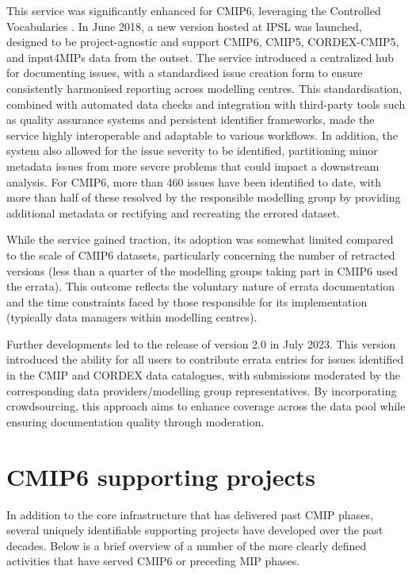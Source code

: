 \documentclass[manuscript]{copernicus}
\begin{document}
This service was significantly enhanced for CMIP6, leveraging the Controlled Vocabularies \citep[see \autoref{sec:CMIPCVs};][]{durack_cmip6_2024}. In June 2018, a new version hosted at IPSL was launched, designed to be project-agnostic and support CMIP6, CMIP5, CORDEX-CMIP5, and input4MIPs data from the outset. The service introduced a centralized hub for documenting issues, with a standardised issue creation form to ensure consistently harmonised reporting across modelling centres. This standardisation, combined with automated data checks and integration with third-party tools such as quality assurance systems and persistent identifier frameworks, made the service highly interoperable and adaptable to various workflows. In addition, the system also allowed for the issue severity to be identified, partitioning minor metadata issues from more severe problems that could impact a downstream analysis. For CMIP6, more than 460 issues have been identified to date, with more than half of these resolved by the responsible modelling group by providing additional metadata or rectifying and recreating the errored dataset.

While the service gained traction, its adoption was somewhat limited compared to the scale of CMIP6 datasets, particularly concerning the number of retracted versions (less than a quarter of the modelling groups taking part in CMIP6 used the errata). This outcome reflects the voluntary nature of errata documentation and the time constraints faced by those responsible for its implementation (typically data managers within modelling centres).

Further developments led to the release of version 2.0 in July 2023. This version introduced the ability for all users to contribute errata entries for issues identified in the CMIP and CORDEX data catalogues, with submissions moderated by the corresponding data providers/modelling group representatives. By incorporating crowdsourcing, this approach aims to enhance coverage across the data pool while ensuring documentation quality through moderation.


\section{CMIP6 supporting projects}
\label{sec:CMIP6SupportingProjects}
In addition to the core infrastructure that has delivered past CMIP phases, several uniquely identifiable supporting projects have developed over the past decades. Below is a brief overview of a number of the more clearly defined activities that have served CMIP6 or preceding MIP phases.
\end{document}

